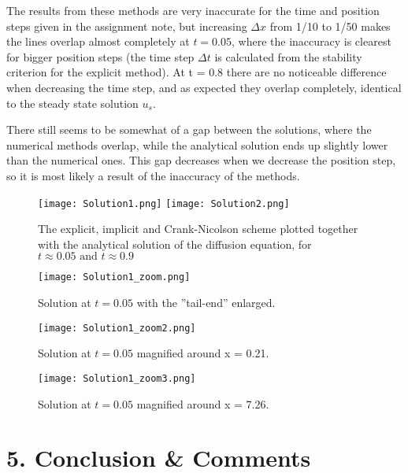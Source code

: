 \documentclass[a4paper,11pt]{report}
\begin{document}
The results from these methods are very inaccurate for the time and position steps given in the assignment note, but increasing \( \Delta x \) from 1/10 to 1/50 makes the lines overlap almost completely at \(t = 0.05\), where the inaccuracy is clearest for bigger position steps (the time step \( \Delta t\) is calculated from the stability criterion for the explicit method).
At t = 0.8 there are no noticeable difference when decreasing the time step, and as expected they overlap completely, identical to the steady state solution \( u_s \).

There still seems to be somewhat of a gap between the solutions, where the numerical methods overlap, while the analytical solution ends up slightly lower than the numerical ones. This gap decreases when we decrease the position step, so it is most likely a result of the inaccuracy of the methods. 

\begin{figure}[H]
\centering
\texttt{[image: Solution1.png]}
\texttt{[image: Solution2.png]}
\caption{The explicit, implicit and Crank-Nicolson scheme plotted together with the analytical solution of the diffusion equation, for \(t \approx  0.05 \, \, \mathrm{and} \, \, t \approx 0.9\)}
\label{fig:solution}
\end{figure}

\begin{figure}[H]
\centering
\texttt{[image: Solution1\_zoom.png]}
\caption{Solution at $ t = 0.05 $ with the ''tail-end'' enlarged.}
\label{fig:solution zoom}
\end{figure}


\begin{figure}[H]
\centering
\texttt{[image: Solution1\_zoom2.png]}
\caption{Solution at $ t = 0.05 $ magnified around x = 0.21.}
\label{fig:solution zoom1}
\end{figure}

\begin{figure}[H]
\centering
\texttt{[image: Solution1\_zoom3.png]}
\caption{Solution at $ t = 0.05 $  magnified around x = 7.26.}
\label{fig:solution zoom2}
\end{figure}


\section*{5. Conclusion \& Comments}
\end{document}
